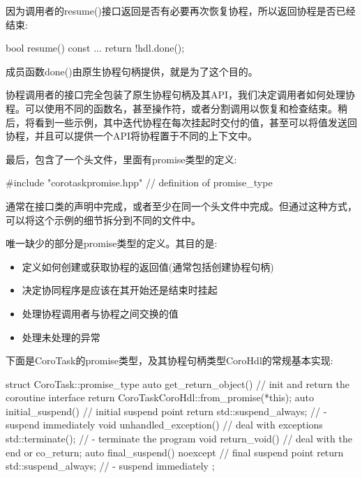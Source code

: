 因为调用者的resume()接口返回是否有必要再次恢复协程，所以返回协程是否已经结束:

\begin{cpp}
bool resume() const {
	...
	return !hdl.done();
}
\end{cpp}

成员函数done()由原生协程句柄提供，就是为了这个目的。

协程调用者的接口完全包装了原生协程句柄及其API，我们决定调用者如何处理协程。可以使用不同的函数名，甚至操作符，或者分割调用以恢复和检查结束。稍后，将看到一些示例，其中迭代协程在每次挂起时交付的值，甚至可以将值发送回协程，并且可以提供一个API将协程置于不同的上下文中。

最后，包含了一个头文件，里面有promise类型的定义:

\begin{cpp}
#include "corotaskpromise.hpp" // definition of promise_type
\end{cpp}

通常在接口类的声明中完成，或者至少在同一个头文件中完成。但通过这种方式，可以将这个示例的细节拆分到不同的文件中。


唯一缺少的部分是promise类型的定义。其目的是:

\begin{itemize}
\item 
定义如何创建或获取协程的返回值(通常包括创建协程句柄)

\item 
决定协同程序是应该在其开始还是结束时挂起

\item 
处理协程调用者与协程之间交换的值

\item 
处理未处理的异常
\end{itemize}

下面是CoroTask的promise类型，及其协程句柄类型CoroHdl的常规基本实现:


\begin{cpp}
struct CoroTask::promise_type {
	auto get_return_object() { // init and return the coroutine interface
		return CoroTask{CoroHdl::from_promise(*this)};
	}
	auto initial_suspend() { // initial suspend point
		return std::suspend_always{}; // - suspend immediately
	}
	void unhandled_exception() { // deal with exceptions
		std::terminate(); // - terminate the program
	}
	void return_void() { // deal with the end or co_return;
	}
	auto final_suspend() noexcept { // final suspend point
		return std::suspend_always{}; // - suspend immediately
	}
};
\end{cpp}
	
